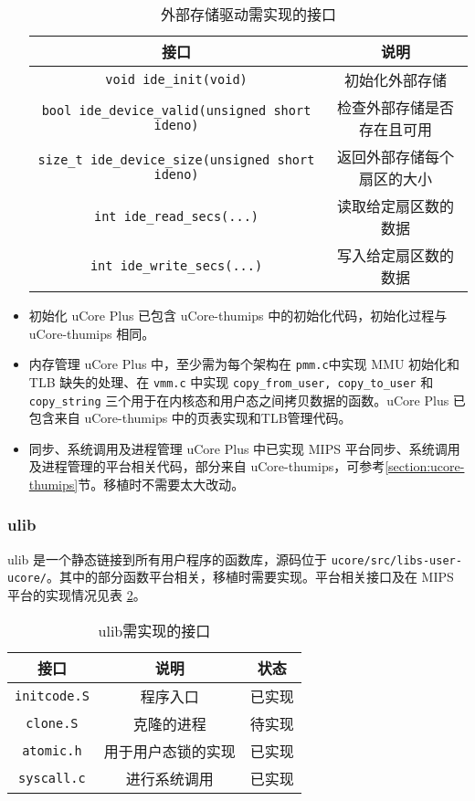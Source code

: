 \begin{itemize}
\begin{table}[!htbp]
\centering
\begin{tabular}{|c|c|}
\hline
\textbf{接口}                                      & \textbf{说明}                      \\ \hline
\texttt{void ide\_init(void)}  & 初始化外部存储                      \\ \hline
\texttt{bool ide\_device\_valid(unsigned short ideno)}   & 检查外部存储是否存在且可用                             \\ \hline
\texttt{size\_t ide\_device\_size(unsigned short ideno)}   & 返回外部存储每个扇区的大小                             \\ \hline
\texttt{int ide\_read\_secs(...)}   & 读取给定扇区数的数据                             \\ \hline
\texttt{int ide\_write\_secs(...)}   & 写入给定扇区数的数据                             \\ \hline
\end{tabular}
    \caption{外部存储驱动需实现的接口}
    \label{table:ide_driver_interface}
\end{table}

\item{初始化}
uCore Plus 已包含 uCore-thumips 中的初始化代码，初始化过程与 uCore-thumips 相同。
\item{内存管理}
uCore Plus 中，至少需为每个架构在 \texttt{pmm.c}中实现 MMU 初始化和 TLB 缺失的处理、在 \texttt{vmm.c} 中实现 \texttt{copy\_from\_user, copy\_to\_user} 和 \texttt{copy\_string} 三个用于在内核态和用户态之间拷贝数据的函数。uCore Plus 已包含来自 uCore-thumips 中的页表实现和TLB管理代码。
\item{同步、系统调用及进程管理} uCore Plus 中已实现 MIPS 平台同步、系统调用及进程管理的平台相关代码，部分来自 uCore-thumips，可参考\ref{section:ucore-thumips}节。移植时不需要太大改动。

\end{itemize}
\subsubsection{ulib}

ulib 是一个静态链接到所有用户程序的函数库，源码位于 \texttt{ucore/src/libs-user-ucore/}。其中的部分函数平台相关，移植时需要实现。平台相关接口及在 MIPS 平台的实现情况见表 \ref{table:ulib_interface}。

\begin{table}[!htbp]
\centering
\begin{tabular}{|c|c|c|}
\hline
\textbf{接口} & \textbf{说明} & \textbf{状态} \\ \hline
\texttt{initcode.S} & 程序入口 & 已实现 \\ \hline
\texttt{clone.S} & 克隆的进程 & 待实现 \\ \hline
\texttt{atomic.h} & 用于用户态锁的实现 & 已实现 \\ \hline
\texttt{syscall.c} & 进行系统调用 & 已实现 \\ \hline
\end{tabular}
    \caption{ulib需实现的接口}
    \label{table:ulib_interface}
\end{table}